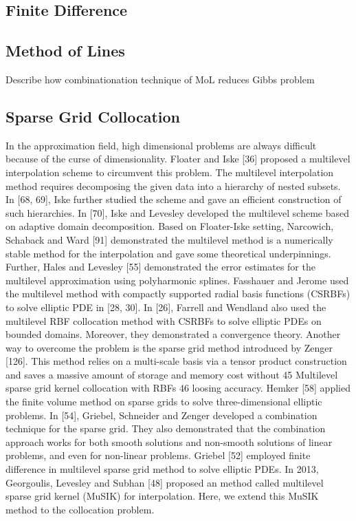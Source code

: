 \documentclass[a4paper]{amsart}
\begin{document}
\subsection{Finite Difference}

\subsection{Method of Lines}
Describe how combinationation technique of MoL reduces Gibbs problem

\subsection{Sparse Grid Collocation}

In the approximation field, high dimensional problems are always difficult because
of the curse of dimensionality. Floater and Iske [36] proposed a multilevel interpolation
scheme to circumvent this problem. The multilevel interpolation method requires
decomposing the given data into a hierarchy of nested subsets. In [68, 69], Iske
further studied the scheme and gave an efficient construction of such hierarchies.
In [70], Iske and Levesley developed the multilevel scheme based on adaptive
domain decomposition. Based on Floater-Iske setting, Narcowich, Schaback and
Ward [91] demonstrated the multilevel method is a numerically stable method for
the interpolation and gave some theoretical underpinnings. Further, Hales and
Levesley [55] demonstrated the error estimates for the multilevel approximation
using polyharmonic splines. Fasshauer and Jerome used the multilevel method
with compactly supported radial basis functions (CSRBFs) to solve elliptic PDE
in [28, 30]. In [26], Farrell and Wendland also used the multilevel RBF collocation
method with CSRBFs to solve elliptic PDEs on bounded domains. Moreover, they
demonstrated a convergence theory.
Another way to overcome the problem is the sparse grid method introduced by
Zenger [126]. This method relies on a multi-scale basis via a tensor product
construction and saves a massive amount of storage and memory cost without
45
Multilevel sparse grid kernel collocation with RBFs 46
loosing accuracy. Hemker [58] applied the finite volume method on sparse grids to
solve three-dimensional elliptic problems. In [54], Griebel, Schneider and Zenger
developed a combination technique for the sparse grid. They also demonstrated
that the combination approach works for both smooth solutions and non-smooth
solutions of linear problems, and even for non-linear problems. Griebel [52] employed
finite difference in multilevel sparse grid method to solve elliptic PDEs. In 2013,
Georgoulis, Levesley and Subhan [48] proposed an method called multilevel sparse
grid kernel (MuSIK) for interpolation. Here, we extend this MuSIK method to
the collocation problem.
\end{document}
